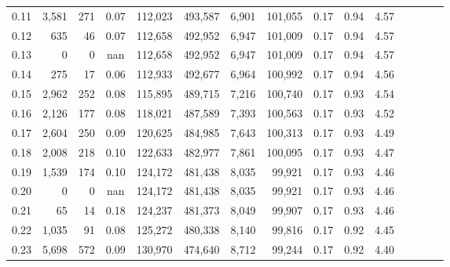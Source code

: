 \begin{tabular}{rrrcrrrrrrrrrrr}
0.11 &   3,581 &    271 &                                       0.07 &  112,023 &  493,587 &    6,901 &  101,055 &  0.17 &  0.94 &                         4.57 \\
0.12 &     635 &     46 &                                       0.07 &  112,658 &  492,952 &    6,947 &  101,009 &  0.17 &  0.94 &                         4.57 \\
0.13 &       0 &      0 &                                        nan &  112,658 &  492,952 &    6,947 &  101,009 &  0.17 &  0.94 &                         4.57 \\
0.14 &     275 &     17 &                                       0.06 &  112,933 &  492,677 &    6,964 &  100,992 &  0.17 &  0.94 &                         4.56 \\
0.15 &   2,962 &    252 &                                       0.08 &  115,895 &  489,715 &    7,216 &  100,740 &  0.17 &  0.93 &                         4.54 \\
0.16 &   2,126 &    177 &                                       0.08 &  118,021 &  487,589 &    7,393 &  100,563 &  0.17 &  0.93 &                         4.52 \\
0.17 &   2,604 &    250 &                                       0.09 &  120,625 &  484,985 &    7,643 &  100,313 &  0.17 &  0.93 &                         4.49 \\
0.18 &   2,008 &    218 &                                       0.10 &  122,633 &  482,977 &    7,861 &  100,095 &  0.17 &  0.93 &                         4.47 \\
0.19 &   1,539 &    174 &                                       0.10 &  124,172 &  481,438 &    8,035 &   99,921 &  0.17 &  0.93 &                         4.46 \\
0.20 &       0 &      0 &                                        nan &  124,172 &  481,438 &    8,035 &   99,921 &  0.17 &  0.93 &                         4.46 \\
0.21 &      65 &     14 &                                       0.18 &  124,237 &  481,373 &    8,049 &   99,907 &  0.17 &  0.93 &                         4.46 \\
0.22 &   1,035 &     91 &                                       0.08 &  125,272 &  480,338 &    8,140 &   99,816 &  0.17 &  0.92 &                         4.45 \\
0.23 &   5,698 &    572 &                                       0.09 &  130,970 &  474,640 &    8,712 &   99,244 &  0.17 &  0.92 &                         4.40 \\

\end{tabular}
